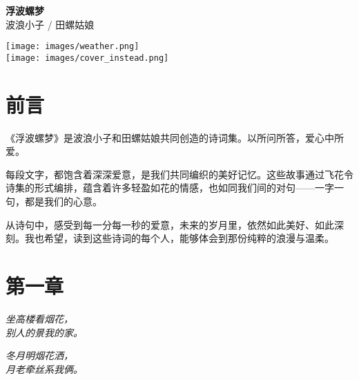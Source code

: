 \documentclass[12pt, a4paper, oneside]{book}
\newenvironment{poem}
  {\vspace{1em}\begin{flushleft}\itshape}
  {\end{flushleft}\vspace{1em}}
\begin{document}
\begin{titlepage}


    \vspace*{2cm} %
    \noindent
    \begin{minipage}{0.4\textwidth}
        \raggedleft %
        {\Huge {} \textbf{浮波螺梦}}\\[2em]
        {\Large 波浪小子 / 田螺姑娘}
    \end{minipage}%
    \hfill
    \begin{minipage}{0.45\textwidth}
        \centering
        \texttt{[image: images/weather.png]}\\[1em]
        \texttt{[image: images/cover\_instead.png]}
    \end{minipage}

    \vfill %

\end{titlepage}



\thispagestyle{empty}

\chapter*{前言}
《浮波螺梦》是波浪小子和田螺姑娘共同创造的诗词集。以所问所答，爱心中所爱。

每段文字，都饱含着深深爱意，是我们共同编织的美好记忆。这些故事通过飞花令诗集的形式编排，蕴含着许多轻盈如花的情感，也如同我们间的对句——一字一句，都是我们的心意。

从诗句中，感受到每一分每一秒的爱意，未来的岁月里，依然如此美好、如此深刻。我也希望，读到这些诗词的每个人，能够体会到那份纯粹的浪漫与温柔。
\tableofcontents
\newpage

\chapter{第一章}
\begin{poem}
坐高楼看烟花，\\
别人的景我的家。\\
\end{poem}
\begin{poem}
冬月明烟花洒，\\
月老牵丝系我俩。\\
\end{poem}
\end{document}
